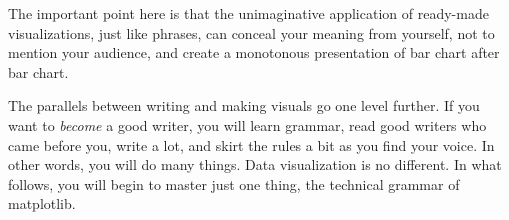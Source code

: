\noindent The important point here is that the unimaginative application of ready-made visualizations, just like phrases, can conceal your meaning from yourself, not to mention your audience, and create a monotonous presentation of bar chart after bar chart. 

The parallels between writing and making visuals go one level further. If you want to \emph{become} a good writer, you will learn grammar, read good writers who came before you, write a lot, and skirt the rules a bit as you find your voice. In other words, you will do many things. Data visualization is no different. In what follows, you will begin to master just one thing, the technical grammar of matplotlib. %

